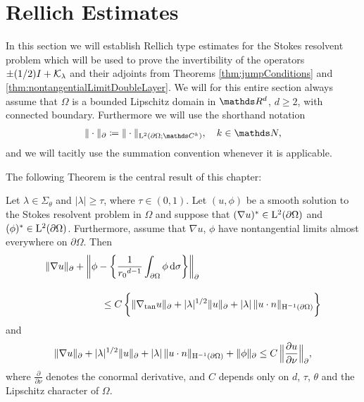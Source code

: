 \chapter{Rellich Estimates}
\label{chap:4}

In this section we will establish Rellich type estimates for the Stokes resolvent problem which will be used to prove the invertibility of the operators $\pm(1/2)I + \mathcal{K}_{\lambda}$ and their adjoints from Theorems  \ref{thm:jumpConditions} and \ref{thm:nontangentialLimitDoubleLayer}.
We will for this entire section always assume that $\Omega$ is a bounded Lipschitz domain in $\R^d$, $d \geq 2$, with connected boundary.
Furthermore we will use the shorthand notation
\begin{align*}
  \| \cdot \|_{\partial} \coloneqq \| \cdot \|_{\Ell^2(\partial\Omega; \C^k)}, \quad k \in \N,
\end{align*}
and we will tacitly use the summation convention whenever it is applicable.

The following Theorem is the central result of this chapter:

\begin{thm}
  \label{thm:rellich}
  Let $\lambda \in \Sigma_\theta$ and $|\lambda| \geq \tau$, where 
  $\tau \in (0,1)$.
  Let $(u,\phi)$ be a smooth solution to the Stokes resolvent problem in $\Omega$ and suppose that $(\nabla u)^* \in \mathrm{L}^2(\partial\Omega)$ and $(\phi)^* \in \mathrm{L}^2(\partial\Omega)$.
  Furthermore, assume that $\nabla u$, $\phi$ have nontangential limits almost everywhere on $\partial\Omega$.
  Then
  \begin{align}
    \label{eq:rellich1}
    \begin{alignedat}{1}
      &\|\nabla u\|_\partial + \bigg\|\phi - \bigg\{ \frac{1}{{r_0}^{d - 1}}\int_{\partial\Omega} \phi \, {\operatorname{d}\!{\sigma}} \bigg\} \bigg\|_\partial \\[1em]
      &\hspace{2cm} \leq C\, \bigg\{ \|\nabla_{\mathrm{tan}} u\|_\partial + |\lambda|^{1/2} \|u\|_\partial + |\lambda| \, \|u \cdot n\|_{\mathrm{H}^{-1}(\partial\Omega)} \bigg\}
    \end{alignedat}
  \end{align}
  and
  \begin{align}
    \label{eq:rellich2}
    \|\nabla u\|_\partial + |\lambda|^{1/2} \|u\|_\partial + |\lambda| \, \|u \cdot n\|_{\mathrm{H}^{-1}(\partial\Omega)} + \|\phi\|_\partial
    \leq C \, \Big\|\frac{\partial u}{\partial \nu} \Big\|_\partial,
  \end{align}
  where $\frac{\partial}{\partial \nu}$ denotes the conormal derivative, and $C$ depends only on $d$, $\tau$, $\theta$ and the Lipschitz character of $\Omega$.
\end{thm}

